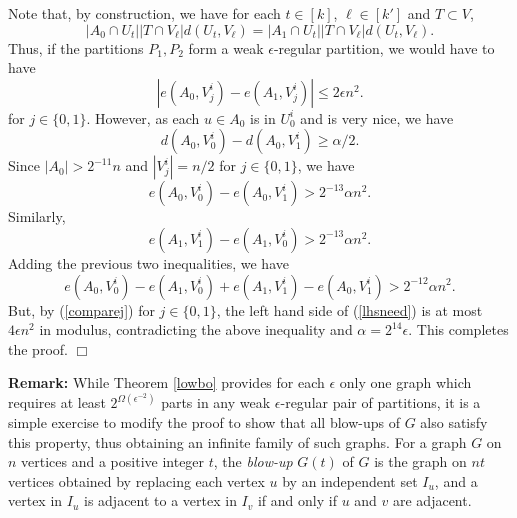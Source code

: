 \documentclass[11pt]{article}
\newenvironment{proof}
      {\medskip\noindent{\bf Proof:}\hspace{1mm}}
      {\hfill$\Box$\medskip}
\begin{document}
\begin{proof}
Note that, by construction, we have for each $t \in [k]$, $\ell \in [k']$ and
$T \subset V$,
$$|A_0 \cap U_t||T \cap V_{\ell}|d(U_t,V_{\ell})=|A_1 \cap U_t||T \cap
V_{\ell}|d(U_t,V_{\ell}).$$
Thus, if the partitions $P_1,P_2$ form a weak $\epsilon$-regular partition, we
would have to have
\begin{equation}\label{comparej}|e(A_0,V_j^i)-e(A_1,V_j^i)| \leq 2\epsilon
n^2.\end{equation}
for $j \in \{0,1\}$. However, as each $u \in A_0$ is in $U_0^i$ and is very
nice, we have $$d(A_0,V_0^i)-d(A_0,V_1^i) \geq \alpha/2.$$ Since $|A_0| >
2^{-11}n$ and $|V_j^i|=n/2$ for $j \in \{0,1\}$, we have
$$e(A_0,V_0^i)-e(A_0,V_1^i) > 2^{-13}\alpha n^2.$$
Similarly, $$e(A_1,V_1^i)-e(A_1,V_0^i) > 2^{-13}\alpha n^2.$$
Adding the previous two inequalities, we have \begin{equation}\label{lhsneed}
e(A_0,V_0^i)-e(A_1,V_0^i)+e(A_1,V_1^i)-e(A_0,V_1^i) >2^{-12}\alpha
n^2.\end{equation} But, by (\ref{comparej}) for $j\in \{0,1\}$, the left hand
side of (\ref{lhsneed}) is at most $4\epsilon n^2$ in modulus, contradicting
the above inequality and $\alpha=2^{14}\epsilon$. This completes the proof.
\end{proof}

{\bf Remark:} While Theorem \ref{lowbo} provides for each $\epsilon$ only one
graph which requires at least $2^{\Omega(\epsilon^{-2})}$ parts in any weak
$\epsilon$-regular pair of partitions, it is a simple exercise to modify the
proof to show that all blow-ups of $G$ also satisfy this property, thus
obtaining an infinite family of such graphs. For a graph $G$ on $n$ vertices
and a positive integer $t$, the {\it blow-up} $G(t)$ of $G$ is the graph on
$nt$ vertices obtained by replacing each vertex $u$ by an independent set
$I_u$, and a vertex in $I_u$ is adjacent to a vertex in $I_v$  if and only if
$u$ and $v$ are adjacent.
\end{document}
